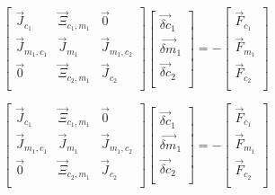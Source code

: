 \begin{equation}
\label{eqn:domainMatrix}
 \begin{bmatrix} 
\vec{J}_{c_1} & \vec{\Xi}_{c_1,m_1} & \vec{0} \\
\vec{J}_{m_1,c_1} & \vec{J}_{m_1} & \vec{J}_{m_1,c_2}  \\
\vec{0} & \vec{\Xi}_{c_2,m_1} & \vec{J}_{c_2} \\
 \end{bmatrix} \begin{bmatrix}
 \vec{\delta c}_{1} \\
 \vec{\delta m}_{1} \\
 \vec{\delta c}_{2} \\
\end{bmatrix}  = -\begin{bmatrix}
 \vec{F}_{c_1} \\
 \vec{F}_{m_1} \\
 \vec{F}_{c_2} \\
\end{bmatrix}
 \end{equation}
 
 \begin{equation}
\label{eqn:domainMatrix}
 \begin{bmatrix} 
\vec{J}_{c_1} & \vec{\Xi}_{c_1,m_1} & \vec{0} \\
\vec{J}_{m_1,c_1} & \vec{J}_{m_1} & \vec{J}_{m_1,c_2}  \\
\vec{0} & \vec{\Xi}_{c_2,m_1} & \vec{J}_{c_2} \\
 \end{bmatrix} \begin{bmatrix}
 \vec{\delta c}_{1} \\
 \vec{\delta m}_{1} \\
 \vec{\delta c}_{2} \\
\end{bmatrix}  = -\begin{bmatrix}
 \vec{F}_{c_1} \\
 \vec{F}_{m_1} \\
 \vec{F}_{c_2} \\
\end{bmatrix}
 \end{equation}

